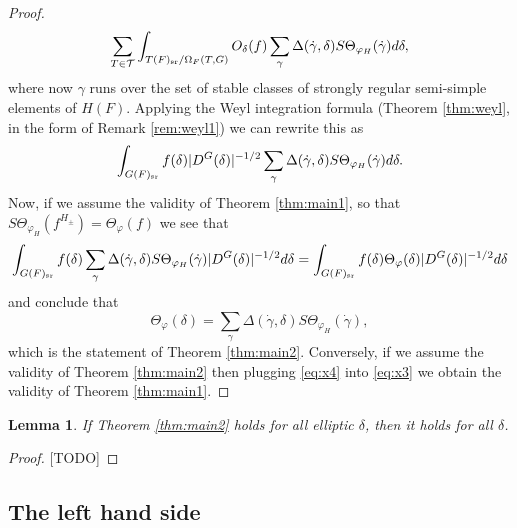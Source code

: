 \documentclass{article}
\newtheorem{lem}[thm]{Lemma}
\theoremstyle{definition}
\numberwithin{equation}{section}
\renewcommand{\-}{\hyp{}}
\newcommand{\warn}[1]{{\leavevmode\color{red}[#1]}}
\begin{document}
\begin{proof}
\[ 
\sum_{T \in \mathcal{T}} \int_{T(F)_{\textrm{sr}}/\Omega_F(T,G)}O_\delta(f) \sum_\gamma \Delta(\dot\gamma,\delta) S\Theta_{\varphi_H}(\dot\gamma) d\delta,	
\] 
where now $\gamma$ runs over the set of stable classes of strongly regular semi-simple elements of $H(F)$. Applying the Weyl integration formula (Theorem \ref{thm:weyl}, in the form of Remark \ref{rem:weyl1}) we can rewrite this as 
\begin{equation} \label{eq:x3}
\int_{G(F)_{\textrm{sr}}}f(\delta) |D^G(\delta)|^{-1/2}\sum_\gamma \Delta(\dot\gamma,\delta) S\Theta_{\varphi_H}(\dot\gamma) d\delta.
\end{equation}
Now, if we assume the validity of Theorem \ref{thm:main1}, so that $S\Theta_{\varphi_H}(f^{H_\pm}) = \Theta_\varphi(f)$ we see that 
\[ \int_{G(F)_{\textrm{sr}}}f(\delta) \sum_\gamma \Delta(\dot\gamma,\delta) S\Theta_{\varphi_H}(\dot\gamma) |D^G(\delta)|^{-1/2}d\delta = \int_{G(F)_{\textrm{sr}}}f(\delta) \Theta_\varphi(\delta)|D^G(\delta)|^{-1/2} d\delta \]
and conclude that 
\begin{equation} \label{eq:x4}
\Theta_\varphi(\delta) = \sum_\gamma \Delta(\dot\gamma,\delta) S\Theta_{\varphi_H}(\dot\gamma),
\end{equation}
which is the statement of Theorem \ref{thm:main2}. Conversely, if we assume the validity of Theorem \ref{thm:main2} then plugging \eqref{eq:x4} into \eqref{eq:x3} we obtain the validity of Theorem \ref{thm:main1}.
\end{proof}

\begin{lem}
If Theorem \ref{thm:main2} holds for all elliptic $\delta$, then it holds for all $\delta$.
\end{lem}
\begin{proof}
\warn{TODO}
\end{proof}

\subsection{The left hand side}


\end{document}
